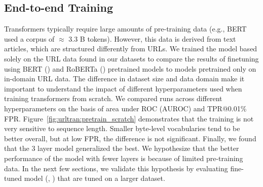 \subsection{End-to-end Training}
Transformers typically require large amounts of pre-training data (e.g., BERT~\citep{devlin2019bert} used a corpus of  $\approx$ 3.3 B tokens).
However, this data is derived from text articles, which are structured differently from URLs.
We trained the \URLTranSysc model based solely on the URL data found in our datasets to compare the results of finetuning using BERT (\URLTranSysb) and RoBERTa (\URLTranSysc) pretrained models to models pretrained only on in-domain URL data. 
The difference in dataset size and data domain make it important to understand the impact of different hyperparameters used when training transformers from scratch.
We compared runs across different hyperparameters on the basis of area under ROC (AUROC) and TPR@0.01\% FPR.
Figure~\ref{fig:urltran:pretrain_scratch} demonstrates that the training is not very sensitive to sequence length. 
Smaller byte-level vocabularies tend to be better overall, but at low FPR, the difference is not significant.
Finally, we found that the 3 layer model generalized the best.
We hypothesize that the better performance of the model with fewer layers is because of limited pre-training data.
In the next few sections, we validate this hypothesis by evaluating fine-tuned model (\URLTranSysb, \URLTranSysr) that are tuned on a larger dataset.

